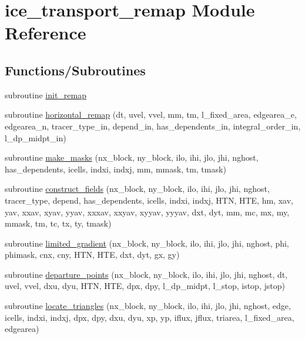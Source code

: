 \hypertarget{namespaceice__transport__remap}{
\section{ice\_\-transport\_\-remap Module Reference}
\label{namespaceice__transport__remap}
}
\subsection*{Functions/Subroutines}
\begin{DoxyCompactItemize}
\item 
subroutine \hyperlink{namespaceice__transport__remap_ae1b446db8b6220961bfcacd0c9b57fd4}{init\_\-remap}
\item 
subroutine \hyperlink{namespaceice__transport__remap_af549caf7a8f27fcbe1cc3d9f8df4bacd}{horizontal\_\-remap} (dt, uvel, vvel, mm, tm, l\_\-fixed\_\-area, edgearea\_\-e, edgearea\_\-n, tracer\_\-type\_\-in, depend\_\-in, has\_\-dependents\_\-in, integral\_\-order\_\-in, l\_\-dp\_\-midpt\_\-in)
\item 
subroutine \hyperlink{namespaceice__transport__remap_a9a9fe0af7f01eed20d6df09ed2e8dc2a}{make\_\-masks} (nx\_\-block, ny\_\-block, ilo, ihi, jlo, jhi, nghost, has\_\-dependents, icells, indxi, indxj, mm, mmask, tm, tmask)
\item 
subroutine \hyperlink{namespaceice__transport__remap_a4c7f753ed3abe19124a7e719e3424dae}{construct\_\-fields} (nx\_\-block, ny\_\-block, ilo, ihi, jlo, jhi, nghost, tracer\_\-type, depend, has\_\-dependents, icells, indxi, indxj, HTN, HTE, hm, xav, yav, xxav, xyav, yyav, xxxav, xxyav, xyyav, yyyav, dxt, dyt, mm, mc, mx, my, mmask, tm, tc, tx, ty, tmask)
\item 
subroutine \hyperlink{namespaceice__transport__remap_ad0f2932484bf98ec16810e79b50b9117}{limited\_\-gradient} (nx\_\-block, ny\_\-block, ilo, ihi, jlo, jhi, nghost, phi, phimask, cnx, cny, HTN, HTE, dxt, dyt, gx, gy)
\item 
subroutine \hyperlink{namespaceice__transport__remap_a6b993110f808c259c52b05216684684f}{departure\_\-points} (nx\_\-block, ny\_\-block, ilo, ihi, jlo, jhi, nghost, dt, uvel, vvel, dxu, dyu, HTN, HTE, dpx, dpy, l\_\-dp\_\-midpt, l\_\-stop, istop, jstop)
\item 
subroutine \hyperlink{namespaceice__transport__remap_a5ed79661ddd56d26d4e863b7ec1b9a0a}{locate\_\-triangles} (nx\_\-block, ny\_\-block, ilo, ihi, jlo, jhi, nghost, edge, icells, indxi, indxj, dpx, dpy, dxu, dyu, xp, yp, iflux, jflux, triarea, l\_\-fixed\_\-area, edgearea)

\end{DoxyCompactItemize}
